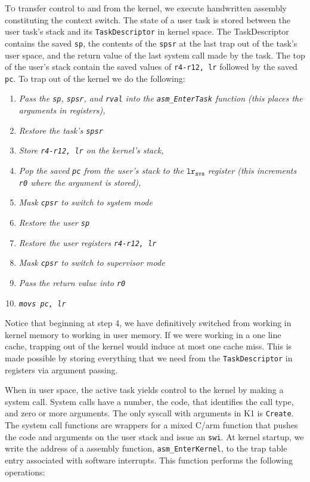 \documentclass{article}
\begin{document}
\textsc{To} transfer control to and from the kernel, we execute handwritten assembly
constituting the context switch. The state of a user task is stored between the
user task's stack and its \texttt{TaskDescriptor} in kernel space. The
TaskDescriptor contains the saved \texttt{sp}, the contents of the \texttt{spsr}
at the last trap out of the task's user space, and the return value of the last
system call made by the task. The top of the user's stack contain the saved
values of \texttt{r4-r12, lr} followed by the saved \texttt{pc}. To trap out of
the kernel we do the following:
\begin{enumerate}
	\item \textit{Pass the \texttt{sp}, \texttt{spsr}, and \texttt{rval} into
		the \texttt{asm\_EnterTask} function (this places the arguments in
		registers),}
	\item \textit{Restore the task's \texttt{spsr}}
	\item \textit{Store \texttt{r4-r12, lr} on the kernel's stack,}
	\item \textit{Pop the saved \texttt{pc} from the user's stack to the
		$\texttt{lr}_\texttt{svs}$ register (this increments \texttt{r0} where
		the argument is stored),}
	\item \textit{Mask \texttt{cpsr} to switch to system mode}
	\item \textit{Restore the user \texttt{sp}}
	\item \textit{Restore the user registers \texttt{r4-r12, lr}}
	\item \textit{Mask \texttt{cpsr} to switch to supervisor mode}
	\item \textit{Pass the return value into \texttt{r0}}
	\item \textit{\texttt{movs pc, lr}}
\end{enumerate}

Notice that beginning at step 4, we have definitively switched from working in
kernel memory to working in user memory. If we were working in a one line
cache, trapping out of the kernel would induce at most one cache miss. This is
made possible by storing everything that we need from the
\texttt{TaskDescriptor} in registers via argument passing.

When in user space, the active task yields control to the kernel by making a
system call. System calls have a number, the code, that identifies the call
type, and zero or more arguments. The only syscall with arguments in K1 is
\texttt{Create}. The system call functions are wrappers for a mixed C/arm
function that pushes the code and arguments on the user stack and issue an
\texttt{swi}. At kernel startup, we write the address of a assembly function,
\texttt{asm\_EnterKernel}, to the trap table entry associated with software
interrupts. This function performs the following operations:
\end{document}

